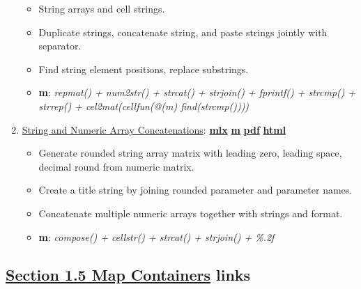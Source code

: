 \documentclass[
]{book}
\providecommand{\tightlist}{%
  \setlength{\itemsep}{0pt}\setlength{\parskip}{0pt}}
\begin{document}
\begin{enumerate}
  \begin{itemize}
  \tightlist
  \item
    String arrays and cell strings.
  \item
    Duplicate strings, concatenate string, and paste strings jointly with separator.
  \item
    Find string element positions, replace substrings.
  \item
    \textbf{m}: \emph{repmat() + num2str() + strcat() + strjoin() + fprintf() + strcmp() + strrep() + cel2mat(cellfun(@(m) find(strcmp())))}
  \end{itemize}
\item
  \href{https://fanwangecon.github.io/M4Econ/amto/string/htmlpdfm/fs_string_strcat.html}{String and Numeric Array Concatenations}: \href{https://github.com/FanWangEcon/M4Econ/blob/master/amto/string/fs_string_strcat.mlx}{\textbf{mlx}} \textbar{} \href{https://github.com/FanWangEcon/M4Econ/blob/master/amto/string/htmlpdfm/fs_string_strcat.m}{\textbf{m}} \textbar{} \href{https://github.com/FanWangEcon/M4Econ/blob/master/amto/string/htmlpdfm/fs_string_strcat.pdf}{\textbf{pdf}} \textbar{} \href{https://fanwangecon.github.io/M4Econ/amto/string/htmlpdfm/fs_string_strcat.html}{\textbf{html}}

  \begin{itemize}
  \tightlist
  \item
    Generate rounded string array matrix with leading zero, leading space, decimal round from numeric matrix.
  \item
    Create a title string by joining rounded parameter and parameter names.
  \item
    Concatenate multiple numeric arrays together with strings and format.
  \item
    \textbf{m}: \emph{compose() + cellstr() + strcat() + strjoin() + \%.2f}
  \end{itemize}
\end{enumerate}

\hypertarget{section-1.5-map-containersmap-containers-links}{%
\subsection{\texorpdfstring{\protect\hyperlink{map-containers}{Section 1.5 Map Containers} links}{Section 1.5 Map Containers links}}\label{section-1.5-map-containersmap-containers-links}}
\end{document}
